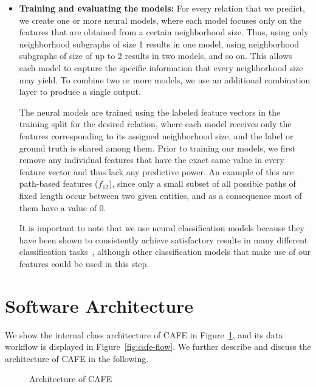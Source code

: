 \begin{itemize}
    \item \textbf{Training and evaluating the models:} For every relation that we predict, we create one or more neural models, where each model focuses only on the features that are obtained from a certain neighborhood size. Thus, using only neighborhood subgraphs of size 1 results in one model, using neighborhood subgraphs of size of up to 2 results in two models, and so on. This allows each model to capture the specific information that every neighborhood size may yield. To combine two or more models, we use an additional combination layer to produce a single output.

    The neural models are trained using the labeled feature vectors in the training split for the desired relation, where each model receives only the features corresponding to its assigned neighborhood size, and the label or ground truth is shared among them. Prior to training our models, we first remove any individual features that have the exact same value in every feature vector and thus lack any predictive power. An example of this are path-based features ($f_{12}$), since only a small subset of all possible paths of fixed length occur between two given entities, and as a consequence most of them have a value of 0.
    
    It is important to note that we use neural classification models because they have been shown to consistently achieve satisfactory results in many different classification tasks~\cite{aggarwal2012, yadav2019, ayala2020}, although other classification models that make use of our features could be used in this step.
\end{itemize}

\section{Software Architecture}\label{sec:cafe-architecture}
We show the internal class architecture of CAFE in Figure~\ref{fig:cafe-diagram}, and its data workflow is displayed in Figure~\ref{fig:cafe-flow}. We further describe and discuss the architecture of CAFE in the following.

\begin{figure}[!htp]
    \centering
    
    \caption{Architecture of CAFE}
    \label{fig:cafe-diagram}
\end{figure}

